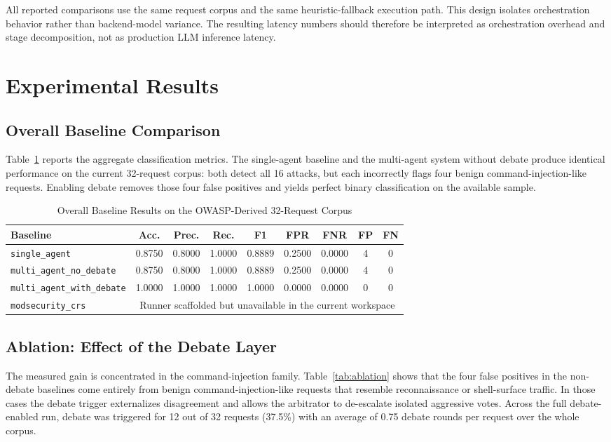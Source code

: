 \documentclass{ieeeaccess}
\begin{document}
All reported comparisons use the same request corpus and the same heuristic-fallback execution path. This design isolates orchestration behavior rather than backend-model variance. The resulting latency numbers should therefore be interpreted as orchestration overhead and stage decomposition, not as production LLM inference latency.

\section{Experimental Results}

\subsection{Overall Baseline Comparison}
Table~\ref{tab:overall-results} reports the aggregate classification metrics. The single-agent baseline and the multi-agent system without debate produce identical performance on the current 32-request corpus: both detect all 16 attacks, but each incorrectly flags four benign command-injection-like requests. Enabling debate removes those four false positives and yields perfect binary classification on the available sample.

\begin{table}[!t]
\caption{Overall Baseline Results on the OWASP-Derived 32-Request Corpus}
\label{tab:overall-results}
\centering
\small
\begin{tabularx}{\textwidth}{lcccccccc}
\toprule
\textbf{Baseline} & \textbf{Acc.} & \textbf{Prec.} & \textbf{Rec.} & \textbf{F1} & \textbf{FPR} & \textbf{FNR} & \textbf{FP} & \textbf{FN} \\
\midrule
\texttt{single\_agent} & 0.8750 & 0.8000 & 1.0000 & 0.8889 & 0.2500 & 0.0000 & 4 & 0 \\
\texttt{multi\_agent\_no\_debate} & 0.8750 & 0.8000 & 1.0000 & 0.8889 & 0.2500 & 0.0000 & 4 & 0 \\
\texttt{multi\_agent\_with\_debate} & 1.0000 & 1.0000 & 1.0000 & 1.0000 & 0.0000 & 0.0000 & 0 & 0 \\
\texttt{modsecurity\_crs} & \multicolumn{8}{c}{Runner scaffolded but unavailable in the current workspace} \\
\bottomrule
\end{tabularx}
\end{table}

\subsection{Ablation: Effect of the Debate Layer}
The measured gain is concentrated in the command-injection family. Table~\ref{tab:ablation} shows that the four false positives in the non-debate baselines come entirely from benign command-injection-like requests that resemble reconnaissance or shell-surface traffic. In those cases the debate trigger externalizes disagreement and allows the arbitrator to de-escalate isolated aggressive votes. Across the full debate-enabled run, debate was triggered for 12 out of 32 requests (37.5\%) with an average of 0.75 debate rounds per request over the whole corpus.
\end{document}

